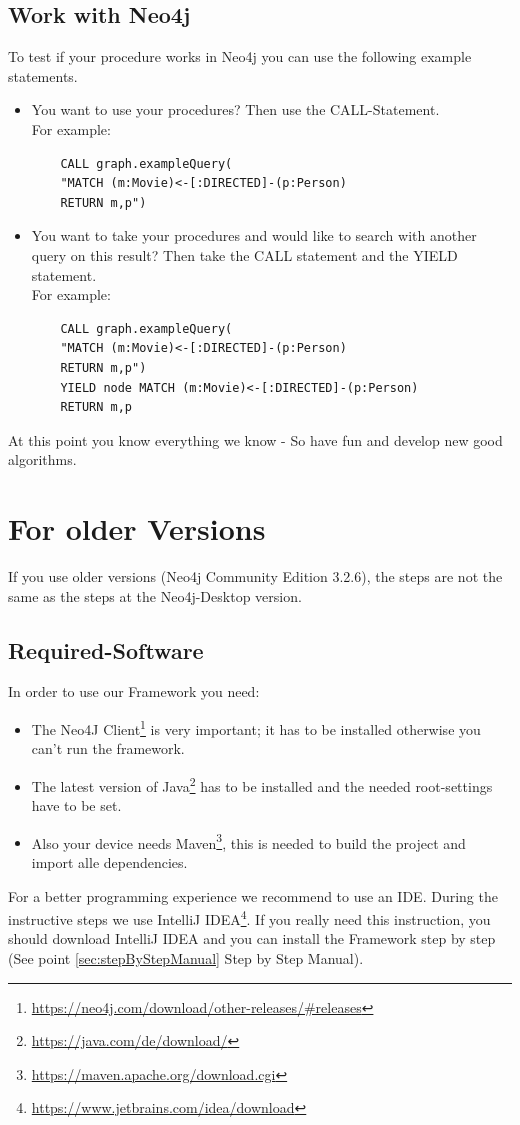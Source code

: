 \section{Work with Neo4j}\label{sec:takeneo4jNew}
To test if your procedure works in Neo4j you can use the following example statements.
\begin{itemize}
	\item You want to use your procedures? Then use the CALL-Statement.\\
	For example:
	\begin{lstlisting}
	CALL graph.exampleQuery(
	"MATCH (m:Movie)<-[:DIRECTED]-(p:Person) 
	RETURN m,p")
	\end{lstlisting}
	\item You want to take your procedures and would like to search with another query on this result? Then take the CALL statement and the YIELD statement. \\
	For example:
	
	\begin{lstlisting}
	CALL graph.exampleQuery(
	"MATCH (m:Movie)<-[:DIRECTED]-(p:Person)
	RETURN m,p") 
	YIELD node MATCH (m:Movie)<-[:DIRECTED]-(p:Person)
	RETURN m,p
	\end{lstlisting}
\end{itemize}
At this point you know everything we know - So have fun and develop new good algorithms.
\newpage

\chapter{For older Versions} \label{chap:olderVersion}
If you use older versions (Neo4j Community Edition 3.2.6), the steps are not the same as the steps at the Neo4j-Desktop version.

\section{Required-Software}\label{sec:neededsoftware}
In order to use our Framework you need:
\begin{itemize}
	\item The Neo4J Client\footnote{\url{https://neo4j.com/download/other-releases/\#releases}} is very important; it has to be installed otherwise you can't run the framework.
	\item The latest version of Java\footnote{\url{https://java.com/de/download/}} has to be installed and the needed root-settings have to be set.
	\item Also your device needs Maven\footnote{\url{https://maven.apache.org/download.cgi}}, this is needed to build the project and import alle dependencies{}.
\end{itemize}
For a better programming experience we recommend to use an IDE. During the instructive steps we use IntelliJ IDEA\footnote{\url{https://www.jetbrains.com/idea/download}}. If you really need this instruction, you should download IntelliJ IDEA and you can install the Framework step by step (See point \ref{sec:stepByStepManual} Step by Step Manual).

